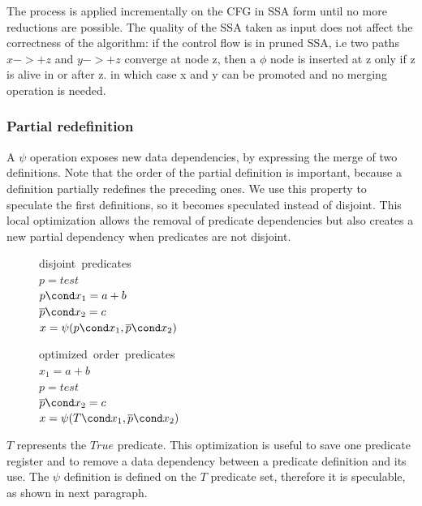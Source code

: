 The process is applied incrementally on the CFG in SSA form until no more reductions are possible. The quality of the SSA taken as input does not affect the correctness of the algorithm: if the control flow is in pruned SSA, i.e two paths $x->+z$ and $y->+z$ converge at node z, then a $\phi$ node is inserted at z only if z is alive in or after z. in which case x and y can be promoted and no merging operation is needed. 

\subsubsection{Partial redefinition}

A $\psi$ operation exposes new data dependencies, by expressing the merge of two definitions. Note that the order of the partial definition is important, because a definition partially redefines the preceding ones. We use this property to speculate the first definitions, so it becomes speculated instead of disjoint. This local optimization allows the removal of predicate dependencies but also creates a new partial dependency when predicates are not disjoint. 

\begin{figure}
\footnotesize
\begin{minipage}[t]{4cm}
\mbox{disjoint predicates} \\
$ p = test $ \\
$ p \cond x_1 = a + b $ \\
$ \overline{p} \cond x_2 = c $ \\
$ x = \psi(p \cond x_1, \overline{p} \cond x_2) $ \\
\end{minipage}
\begin{minipage}[t]{4cm}
\mbox{optimized order predicates} \\
$ x_1 = a + b $ \\
$ p = test $ \\
$ \overline{p} \cond x_2 = c $ \\
$ x = \psi(T \cond x_1, \overline{p} \cond x_2) $ \\
\end{minipage}
\end{figure}

$T$ represents the $True$ predicate. This optimization is useful to save one predicate register and to remove a data dependency between a predicate definition and its use. 
The $\psi$ definition is defined on the $T$ predicate set, therefore it is speculable, as shown in next paragraph.

